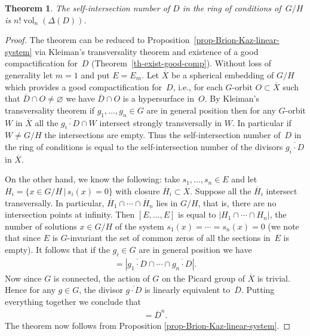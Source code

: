 \documentclass[pdftex]{sigma}
\def \vol{\operatorname{vol}}
\numberwithin{equation}{section}
\newtheorem{Th}{Theorem}[section]
\theoremstyle{definition}
\begin{document}
\begin{Th} \label{th-main}The self-intersection number of $D$ in the ring of conditions of~$G/H$ is \linebreak $n! \vol_n(\Delta(D))$.
\end{Th}
\begin{proof}
The theorem can be reduced to Proposition~\ref{prop-Brion-Kaz-linear-system} via Kleiman's transversality theorem and existence of a good compactification for~$D$ (Theorem~\ref{th-exist-good-comp}). Without loss of generality let $m=1$ and put $E=E_m$. Let $\overline{X}$ be a spherical embedding of $G/H$ which provides a good compactification for~$D$, i.e., for each $G$-orbit $O\subset \overline{X}$ such that $\overline{D}\cap O\neq \varnothing$ we have $\overline{D}\cap O$ is a hypersurface in~$O$. By Kleiman's transversality theorem if $g_1, \ldots, g_n \in G$ are in general position then for any $G$-orbit $W$ in $\overline{X}$ all the $\overline{g_i \cdot D}\cap W$ intersect strongly transversally in $W$. In particular if $W\neq G/H$ the intersections are empty. Thus the self-intersection number of~$D$ in the ring of conditions is equal to the self-intersection number of the divisors $\overline{g_i \cdot D}$ in $\overline{X}$.

On the other hand, we know the following: take $s_1, \ldots, s_n \in E$ and let $H_i = \{x \in G/H \,|\, s_i(x) \allowbreak = 0 \}$ with closure $\overline{H}_i \subset \overline{X}$. Suppose all the $\overline{H}_i$ intersect transversally. In particular, $\overline{H}_1 \cap \cdots \cap \overline{H}_n$ lies in $G/H$, that is, there are no intersection points at infinity. Then $[E, \ldots, E]$ is equal to $|H_1 \cap \cdots \cap H_n|$, the number of solutions $x \in G/H$ of the system $s_1(x) = \cdots = s_n(x) = 0$ (we note that since $E$ is $G$-invariant the set of common zeros of all the sections in~$E$ is empty).
It follows that if the $g_i \in G$ are in general position we have
\begin{gather*} [E, \ldots, E] = |\overline{g_1 \cdot D} \cap \cdots \cap \overline{g_n \cdot D}|.
\end{gather*}
Now since $G$ is connected, the action of $G$ on the Picard group of $\overline{X}$ is trivial. Hence for any $g \in G$, the divisor $\overline{g \cdot D}$ is linearly equivalent to~$\overline{D}$. Putting everything together we conclude that
\begin{gather*} [E, \ldots, E] = \overline{D}^n.\end{gather*}
 The theorem now follows from Proposition \ref{prop-Brion-Kaz-linear-system}.
\end{proof}
\end{document}
